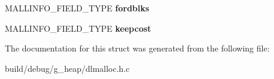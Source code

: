 \begin{DoxyCompactItemize}
\item 
\hypertarget{structmallinfo_a2fc75bf31817d4a64d0a6970aa5278dd}{M\-A\-L\-L\-I\-N\-F\-O\-\_\-\-F\-I\-E\-L\-D\-\_\-\-T\-Y\-P\-E {\bfseries fordblks}}\label{structmallinfo_a2fc75bf31817d4a64d0a6970aa5278dd}

\item 
\hypertarget{structmallinfo_a9cd2ce910ff603217426d9b1b7c0e430}{M\-A\-L\-L\-I\-N\-F\-O\-\_\-\-F\-I\-E\-L\-D\-\_\-\-T\-Y\-P\-E {\bfseries keepcost}}\label{structmallinfo_a9cd2ce910ff603217426d9b1b7c0e430}

\end{DoxyCompactItemize}


The documentation for this struct was generated from the following file\-:\begin{DoxyCompactItemize}
\item 
build/debug/g\-\_\-heap/dlmalloc.\-h.\-c\end{DoxyCompactItemize}
